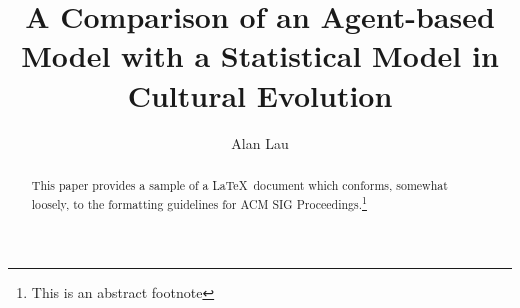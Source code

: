 \documentclass[sigconf]{acmart}
\begin{document}
\title{A Comparison of an Agent-based Model with a Statistical Model in Cultural Evolution}


\author{Alan Lau}



\begin{abstract}
This paper provides a sample of a \LaTeX\ document which conforms,
somewhat loosely, to the formatting guidelines for
ACM SIG Proceedings.\footnote{This is an abstract footnote}
\end{abstract}

%
%





\maketitle




 
\end{document}
